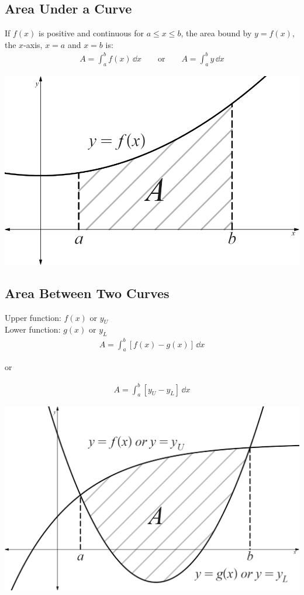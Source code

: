 \documentclass[10pt, a4paper, titlepage]{article}
\begin{document}
\begin{multicols*}{3}
	\dotfill
	\subsection{Area Under a Curve}
	If $f(x)$ is positive and continuous for $a\leq x\leq b$, the area bound by $y=f(x)$, the $x$-axis, $x=a$ and $x=b$ is:
	\begin{align}
		A=\int_{a}^{b}f(x)\,\dd{x}\qquad \text{or}\qquad A=\int_{a}^{b}y\,\dd{x}
	\end{align}
	\begin{center}
		\includegraphics[width=0.9\linewidth]{area_under_a_curve.png}\\
	\end{center}

	\dotfill
	\subsection{Area Between Two Curves}
	Upper function: $f(x)$ or $y_U$\\
	Lower function: $g(x)$ or $y_L$
	\begin{align}
		A=\int_{a}^{b}\left[f(x)-g(x)\right]\,\dd{x}
	\end{align}
	\begin{center}
		or
	\end{center}
	\begin{align}
		A=\int_{a}^{b}\left[y_U-y_L\right]\,\dd{x}
	\end{align}
	\begin{center}
		\includegraphics[width=0.9\linewidth]{area_between_two_curves.png}\\
	\end{center}


\end{multicols*}
\end{document}
